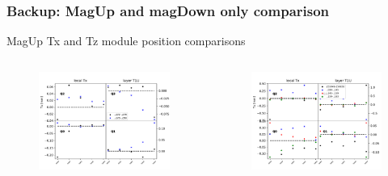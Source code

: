 \documentclass[aspectratio=1610, 12pt]{beamer}
\begin{document}
\begin{frame}\frametitle{Backup: MagUp and magDown only comparison}
  MagUp Tx and Tz module position comparisons
  \begin{columns}
    \begin{column}[c]{0.48\textwidth}
      \begin{figure}
        \includegraphics[width=\textwidth]{plots/stability_plots/diff_MU_T1U_Tx.pdf}
      \end{figure}
    \end{column}
    \begin{column}[c]{0.48\textwidth}
      \begin{figure}
        \includegraphics[width=\textwidth]{plots/stability_plots/diff_MD_T1U_Tx.pdf}
      \end{figure}
    \end{column}
  \end{columns}
\end{frame}
\end{document}
